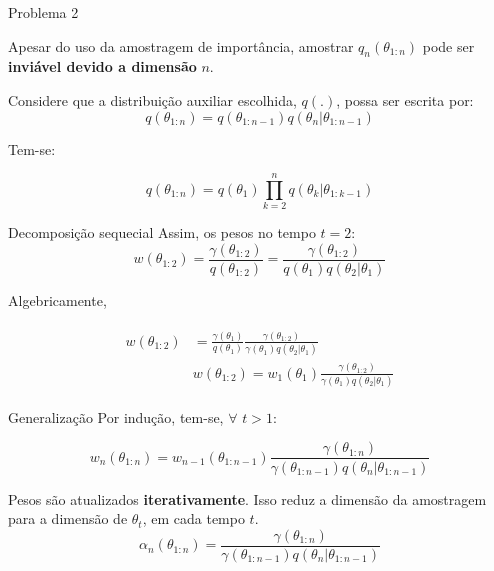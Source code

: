 \documentclass{beamer}
\begin{document}
\begin{frame}{Problema 2}

Apesar do uso da amostragem de importância, amostrar $q_n(\theta_{1:n})$ pode ser \textbf{inviável devido a dimensão} $n$.

\vspace{0.5cm}

\pause

Considere que a distribuição auxiliar escolhida, $q(.)$, possa ser escrita por:
$$ q(\theta_{1:n})  = q(\theta_{1:n-1})q(\theta_n|\theta_{1:n-1})$$

\vspace{0.5cm}

\pause
Tem-se:

$$ q(\theta_{1:n})  = q(\theta_1)\prod_{k=2}^n q(\theta_k|\theta_{1:k-1})$$

\end{frame}





\begin{frame}{Decomposição sequecial}
Assim, os pesos no tempo $t=2$:
$$
w(\theta_{1:2}) =\frac{\gamma(\theta_{1:2})}{q(\theta_{1:2})} = \frac{\gamma(\theta_{1:2})}{q(\theta_1)q(\theta_2|\theta_1)}
$$

\pause

Algebricamente,

\begin{eqnarray} \left. \begin{aligned}
w(\theta_{1:2})  & = \frac{\gamma(\theta_{1})}{q(\theta_{1})}\frac{\gamma(\theta_{1:2})}{\gamma(\theta_1)q(\theta_2|\theta_1)} \\
				 &  w(\theta_{1:2}) = w_1(\theta_1) \frac{\gamma(\theta_{1:2})}{\gamma(\theta_1)q(\theta_2|\theta_1)} \nonumber
\end{aligned}\right. \end{eqnarray}



\end{frame}

\begin{frame}{Generalização}
Por indução, tem-se, $\forall$ $t>1$:

$$
w_n(\theta_{1:n}) = w_{n-1}(\theta_{1:n-1}) \frac{\gamma(\theta_{1:n})}{\gamma(\theta_{1:n-1})q(\theta_n|\theta_{1:n-1})}
$$

\pause
\vspace{0.5cm}

Pesos são atualizados \textbf{iterativamente}. Isso reduz a dimensão da amostragem para a dimensão de $\theta_t$, em cada tempo $t$.
$$
\alpha_n(\theta_{1:n}) = \frac{\gamma(\theta_{1:n})}{\gamma(\theta_{1:n-1})q(\theta_n|\theta_{1:n-1})}
$$
\end{frame}
\end{document}
